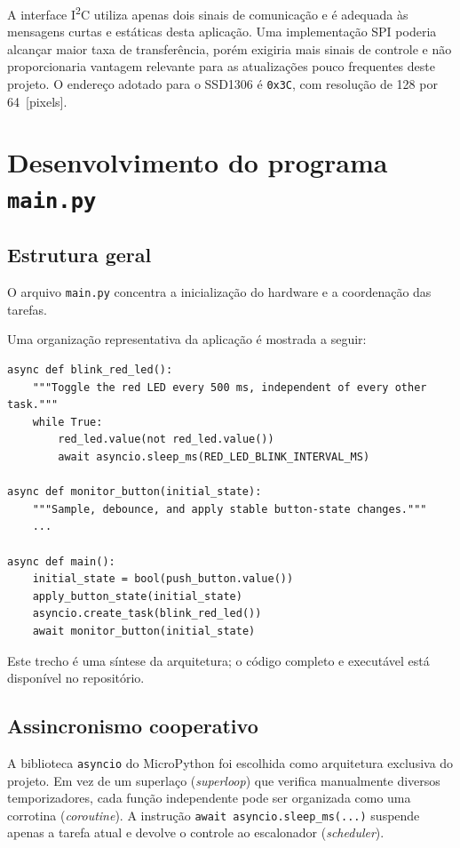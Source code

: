 \documentclass[12pt,a4paper]{article}
\begin{document}
A interface I\textsuperscript{2}C utiliza apenas dois sinais de comunicação e é adequada às mensagens curtas e estáticas desta aplicação. Uma implementação SPI poderia alcançar maior taxa de transferência, porém exigiria mais sinais de controle e não proporcionaria vantagem relevante para as atualizações pouco frequentes deste projeto. O endereço adotado para o SSD1306 é \texttt{0x3C}, com resolução de 128 por 64~[pixels].

\section{Desenvolvimento do programa \texttt{main.py}}

\subsection{Estrutura geral}

O arquivo \texttt{main.py} concentra a inicialização do hardware e a coordenação das tarefas.

Uma organização representativa da aplicação é mostrada a seguir:

\begin{lstlisting}[caption={Estrutura lógica resumida do programa.},label={lst:estrutura}]
async def blink_red_led():
    """Toggle the red LED every 500 ms, independent of every other task."""
    while True:
        red_led.value(not red_led.value())
        await asyncio.sleep_ms(RED_LED_BLINK_INTERVAL_MS)

async def monitor_button(initial_state):
    """Sample, debounce, and apply stable button-state changes."""
    ...

async def main():
    initial_state = bool(push_button.value())
    apply_button_state(initial_state)
    asyncio.create_task(blink_red_led())
    await monitor_button(initial_state)
\end{lstlisting}

Este trecho é uma síntese da arquitetura; o código completo e executável está disponível no repositório.

\subsection{Assincronismo cooperativo}

A biblioteca \texttt{asyncio} do MicroPython foi escolhida como arquitetura exclusiva do projeto. Em vez de um superlaço (\textit{superloop}) que verifica manualmente diversos temporizadores, cada função independente pode ser organizada como uma corrotina (\textit{coroutine}). A instrução \texttt{await asyncio.sleep\_ms(...)} suspende apenas a tarefa atual e devolve o controle ao escalonador (\textit{scheduler}).
\end{document}
